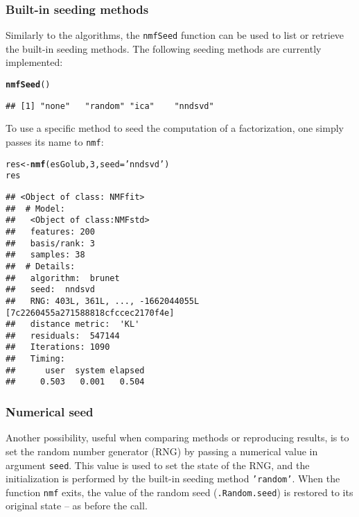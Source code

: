 \documentclass[a4paper]{article}\usepackage[]{graphicx}\usepackage[]{color}
\makeatletter
\newcommand{\hlnum}[1]{\textcolor[rgb]{0.686,0.059,0.569}{#1}}%
\newcommand{\hlstr}[1]{\textcolor[rgb]{0.192,0.494,0.8}{#1}}%
\newcommand{\hlstd}[1]{\textcolor[rgb]{0.345,0.345,0.345}{#1}}%
\newcommand{\hlkwb}[1]{\textcolor[rgb]{0.69,0.353,0.396}{#1}}%
\newcommand{\hlkwc}[1]{\textcolor[rgb]{0.333,0.667,0.333}{#1}}%
\newcommand{\hlkwd}[1]{\textcolor[rgb]{0.737,0.353,0.396}{\textbf{#1}}}%
\newenvironment{kframe}{%
 \def\at@end@of@kframe{}%
 \ifinner\ifhmode%
  \def\at@end@of@kframe{\end{minipage}}%
  \begin{minipage}{\columnwidth}%
 \fi\fi%
 \def\FrameCommand##1{\hskip\@totalleftmargin \hskip-\fboxsep
 \colorbox{shadecolor}{##1}\hskip-\fboxsep
     \hskip-\linewidth \hskip-\@totalleftmargin \hskip\columnwidth}%
 \MakeFramed {\advance\hsize-\width
   \@totalleftmargin\z@ \linewidth\hsize
   \@setminipage}}%
 {\par\unskip\endMakeFramed%
 \at@end@of@kframe}
\newenvironment{knitrout}{}{} %
\let\code=\texttt
\makeatother
\begin{document}
\subsubsection{Built-in seeding methods}
Similarly to the algorithms, the \code{nmfSeed} function can be used to list or retrieve the built-in seeding methods.
The following seeding methods are currently implemented:

\begin{knitrout}
\color{fgcolor}\begin{kframe}
\begin{alltt}
\hlkwd{nmfSeed}\hlstd{()}
\end{alltt}
\begin{verbatim}
## [1] "none"   "random" "ica"    "nndsvd"
\end{verbatim}
\end{kframe}
\end{knitrout}

To use a specific method to seed the computation of a factorization, one simply passes its name to \code{nmf}:

\begin{knitrout}
\color{fgcolor}\begin{kframe}
\begin{alltt}
\hlstd{res} \hlkwb{<-} \hlkwd{nmf}\hlstd{(esGolub,} \hlnum{3}\hlstd{,} \hlkwc{seed}\hlstd{=}\hlstr{'nndsvd'}\hlstd{)}
\hlstd{res}
\end{alltt}
\begin{verbatim}
## <Object of class: NMFfit>
##  # Model:
##   <Object of class:NMFstd>
##   features: 200 
##   basis/rank: 3 
##   samples: 38 
##  # Details:
##   algorithm:  brunet 
##   seed:  nndsvd 
##   RNG: 403L, 361L, ..., -1662044055L [7c2260455a271588818cfccec2170f4e]
##   distance metric:  'KL' 
##   residuals:  547144 
##   Iterations: 1090 
##   Timing:
##      user  system elapsed 
##     0.503   0.001   0.504
\end{verbatim}
\end{kframe}
\end{knitrout}

\subsubsection{Numerical seed}\label{sec:numseed}
Another possibility, useful when comparing methods or reproducing results, is to set the random number generator (RNG) by passing a numerical value in argument \code{seed}.
This value is used to set the state of the RNG, and the initialization is performed by the built-in seeding method \code{'random'}.
When the function \code{nmf} exits, the value of the random seed (\code{.Random.seed}) is restored to its original state -- as before the call.
\end{document}

